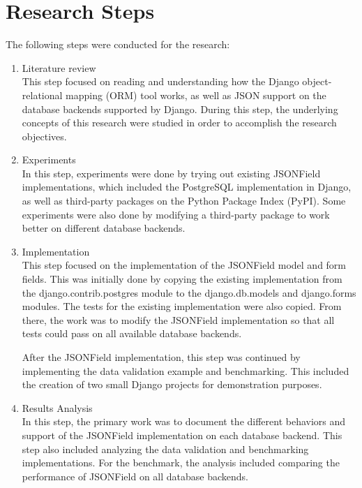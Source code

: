\section{Research Steps}

The following steps were conducted for the research:

\begin{enumerate}
    \item Literature review \\
    This step focused on reading and understanding how the Django
    object-relational mapping (ORM) tool works, as well as JSON support on the
    database backends supported by Django. During this step, the underlying
    concepts of this research were studied in order to accomplish the research
    objectives.

    \item Experiments \\
    In this step, experiments were done by trying out existing JSONField
    implementations, which included the PostgreSQL implementation in Django,
    as well as third-party packages on the Python Package Index (PyPI). Some
    experiments were also done by modifying a third-party package to work
    better on different database backends.

    \item Implementation \\
    This step focused on the implementation of the JSONField model and form
    fields. This was initially done by copying the existing implementation
    from the django.contrib.postgres module to the django.db.models and
    django.forms modules. The tests for the existing implementation were also
    copied. From there, the work was to modify the JSONField implementation so
    that all tests could pass on all available database backends.

    After the JSONField implementation, this step was continued by implementing
    the data validation example and benchmarking. This included the creation of
    two small Django projects for demonstration purposes.

    \item Results Analysis \\
    In this step, the primary work was to document the different behaviors and
    support of the JSONField implementation on each database backend. This step
    also included analyzing the data validation and benchmarking
    implementations. For the benchmark, the analysis included comparing the
    performance of JSONField on all database backends.
\end{enumerate}

